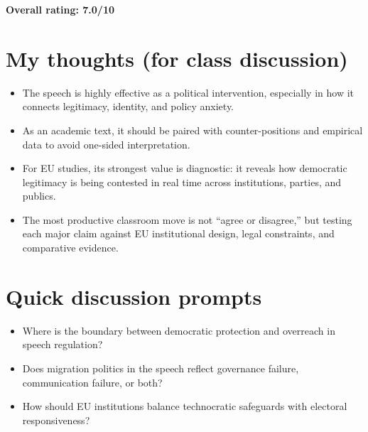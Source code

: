 \documentclass[12pt]{article}
\begin{document}
\noindent\textbf{Overall rating: 7.0/10}

\section*{My thoughts (for class discussion)}

\begin{itemize}
    \item The speech is highly effective as a political intervention, especially in how it connects legitimacy, identity, and policy anxiety.
    \item As an academic text, it should be paired with counter-positions and empirical data to avoid one-sided interpretation.
    \item For EU studies, its strongest value is diagnostic: it reveals how democratic legitimacy is being contested in real time across institutions, parties, and publics.
    \item The most productive classroom move is not ``agree or disagree,'' but testing each major claim against EU institutional design, legal constraints, and comparative evidence.
\end{itemize}

\section*{Quick discussion prompts}

\begin{itemize}
    \item Where is the boundary between democratic protection and overreach in speech regulation?
    \item Does migration politics in the speech reflect governance failure, communication failure, or both?
    \item How should EU institutions balance technocratic safeguards with electoral responsiveness?
\end{itemize}
\end{document}
